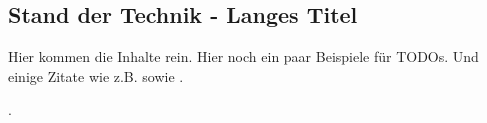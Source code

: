 \begin{showRelatedWork}%
%
\chapter[Stand der Technik - Kurztitel für Inhaltsverzeichnis und Kolumnentitel]{Stand der Technik - Langes Titel}%
\label{chap:StandDerTechnik}
%
Hier kommen die Inhalte rein.
%
%
%
Hier noch ein paar Beispiele für TODOs.
Und einige Zitate wie z.B. 
\cite{BarShalom-Tse-TICEWPDA-Automatica-75,BarShalom-TrackingMethodsin-1978,Bar-Shalom-AC1984-JPDA,BarShalom-MTMST-1990,BarShalom-MTT-Buch-Band2,BarShalom-MMTAA-Buch-2000}
sowie
\cite{Zomotor-Fahrverhalten-1991}.

 .

%
\end{showRelatedWork}%